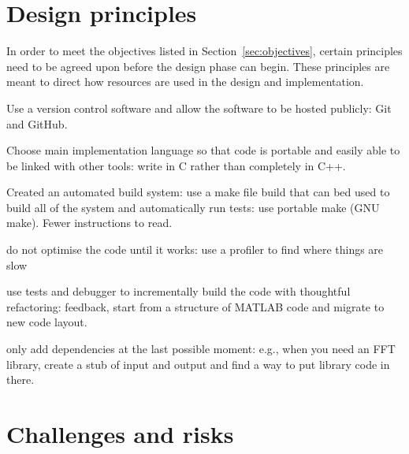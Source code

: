 \section{Design principles}

In order to meet the objectives listed in
Section~\ref{sec:objectives}, certain principles need to be agreed
upon before the design phase can begin. These principles are meant
to direct how resources are used in the design and implementation.

Use a version control software and allow the software to be hosted
publicly: Git and GitHub.

Choose main implementation language so that code is portable and
easily able to be linked with other tools: write in C rather than
completely in C++.

Created an automated build system: use a make file build that can
bed used to build all of the system and automatically run tests:
use portable make (GNU make). Fewer instructions to read.

do not optimise the code until it works: use a profiler to find
where things are slow

use tests and debugger to incrementally build the code with
thoughtful refactoring: feedback, start from a structure of MATLAB
code and migrate to new code layout.

only add dependencies at the last possible moment: e.g., when you
need an FFT library, create a stub of input and output and find a
way to put library code in there.

\section{Challenges and risks}

